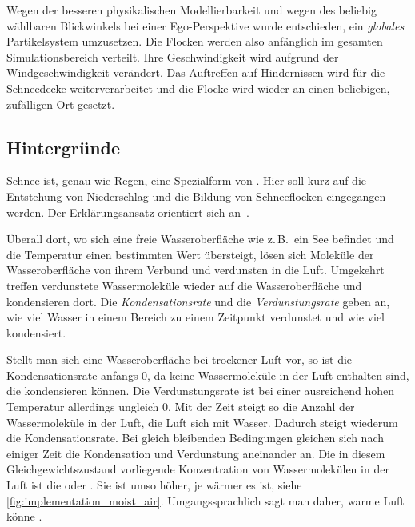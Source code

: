 Wegen der besseren physikalischen Modellierbarkeit und wegen des
beliebig wählbaren Blickwinkels bei einer Ego-Perspektive wurde
entschieden, ein \emph{globales} Partikelsystem umzusetzen. Die
Flocken werden also anfänglich im gesamten Simulationsbereich
verteilt. Ihre Geschwindigkeit wird aufgrund der Windgeschwindigkeit
verändert. Das Auftreffen auf Hindernissen wird für die Schneedecke
weiterverarbeitet und die Flocke wird wieder an einen beliebigen,
zufälligen Ort gesetzt.

\subsection{Hintergründe}

Schnee ist, genau wie Regen, eine Spezialform von .
Hier soll kurz auf die Entstehung von Niederschlag und die Bildung von
Schneeflocken eingegangen werden. Der Erklärungsansatz orientiert sich
an~\cite{wiki:Luftfeuchtigkeit}.

Überall dort, wo sich eine freie Wasseroberfläche wie z.\,B.\ ein See befindet und
die Temperatur einen bestimmten Wert übersteigt, lösen sich Moleküle der
Wasseroberfläche von ihrem Verbund und verdunsten in die Luft. Umgekehrt treffen
verdunstete Wassermoleküle wieder auf die Wasseroberfläche und kondensieren
dort. Die \emph{Kondensationsrate} und die
\emph{Verdunstungsrate} geben an, wie viel Wasser in einem Bereich zu
einem Zeitpunkt verdunstet und wie viel kondensiert.

Stellt man sich eine Wasseroberfläche bei trockener Luft vor, so ist
die Kondensationsrate anfangs 0, da keine Wassermoleküle in der Luft
enthalten sind, die kondensieren können. Die Verdunstungsrate ist
bei einer ausreichend hohen Temperatur allerdings ungleich 0. Mit der
Zeit steigt so die Anzahl der Wassermoleküle in der Luft, die Luft
 sich mit Wasser. Dadurch steigt wiederum die
Kondensationsrate. Bei gleich bleibenden Bedingungen gleichen sich
nach einiger Zeit die Kondensation und Verdunstung aneinander an.  Die
in diesem Gleichgewichtszustand vorliegende Konzentration von
Wassermolekülen in der Luft ist die
 oder . Sie ist umso höher, je wärmer es ist, siehe
\cref{fig:implementation_moist_air}. Umgangssprachlich sagt man
daher, warme Luft könne .

